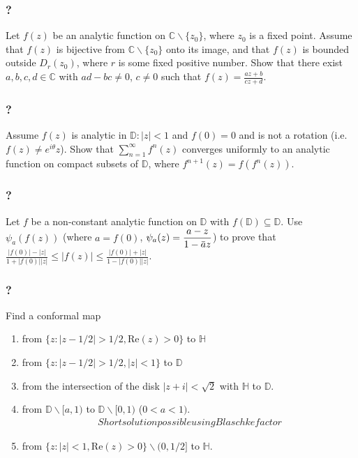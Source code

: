 \hypertarget{section-174}{%
\subsubsection{?}\label{section-174}}

Let \(f(z)\) be an analytic function on
\({\mathbb C} \backslash \{ z_0 \}\), where \(z_0\) is a fixed point.
Assume that \(f(z)\) is bijective from
\({\mathbb C} \backslash \{ z_0 \}\) onto its image, and that \(f(z)\)
is bounded outside \(D_r(z_0)\), where \(r\) is some fixed positive
number. Show that there exist \(a, b, c, d \in \mathbb C\) with
\(ad-bc \neq 0\), \(c \neq 0\) such that
\(\displaystyle f(z) = \frac{az + b}{cz + d}\).

\hypertarget{section-175}{%
\subsubsection{?}\label{section-175}}

Assume \(f(z)\) is analytic in \({\mathbb D}: |z|<1\) and \(f(0)=0\) and
is not a rotation (i.e.~\(f(z) \neq e^{i \theta} z\)). Show that
\(\displaystyle \sum_{n=1}^\infty f^{n}(z)\) converges uniformly to an
analytic function on compact subsets of \({\mathbb D}\), where
\(f^{n+1}(z) = f(f^{n}(z))\).

\hypertarget{section-176}{%
\subsubsection{?}\label{section-176}}

Let \(f\) be a non-constant analytic function on \(\mathbb D\) with
\(f(\mathbb D) \subseteq \mathbb D\). Use \(\psi_{a} (f(z))\) (where
\(a=f(0)\),
\(\displaystyle \psi_a(z) = \frac{a - z}{1 - \mkern 1.5mu\overline{\mkern-1.5mua\mkern-1.5mu}\mkern 1.5muz}\))
to prove that
\(\displaystyle \frac{|f(0)| - |z|}{1 + |f(0)||z|} \leq |f(z)| \leq \frac{|f(0)| + |z|}{1 - |f(0)||z|}\).

\hypertarget{section-177}{%
\subsubsection{?}\label{section-177}}

Find a conformal map

\begin{enumerate}
\def\labelenumi{\arabic{enumi}.}
\item
  from \(\{ z: |z - 1/2| > 1/2, \text{Re}(z)>0 \}\) to \(\mathbb H\)
\item
  from \(\{ z: |z - 1/2| > 1/2, |z| <1 \}\) to \(\mathbb D\)
\item
  from the intersection of the disk \(|z + i| < \sqrt{2}\) with
  \({\mathbb H}\) to \({\mathbb D}\).
\item
  from \({\mathbb D} \backslash [a, 1)\) to
  \({\mathbb D} \backslash [0, 1)\) (\(0<a<1)\).
  \begin{align*} Short solution
  possible using Blaschke factor\end{align*}
\item
  from \(\{ z: |z| < 1, \text{Re}(z) > 0 \} \backslash (0, 1/2]\) to
  \(\mathbb H\).
\end{enumerate}

